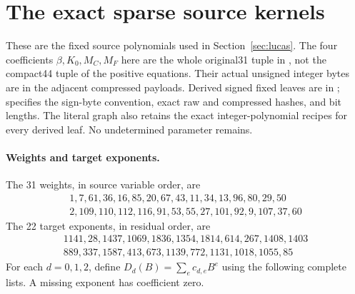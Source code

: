 \section{The exact sparse source kernels}\label{app:kernels}
These are the fixed source polynomials used in Section~\ref{sec:lucas}.
The four coefficients $\beta,K_0,M_C,M_F$ here are the whole original31
tuple in , not the compact44
tuple of the positive equations. Their actual unsigned integer bytes are
in the adjacent compressed payloads. Derived signed fixed leaves are
in ;  specifies
the sign-byte convention, exact raw and compressed hashes, and bit lengths.
The literal graph also retains the exact integer-polynomial recipes for
every derived leaf. No undetermined parameter remains.
\paragraph{Weights and target exponents.}
The 31 weights, in source variable order, are
\[\begin{gathered}
1,7,61,36,16,85,20,67,43,11,34,13,96,80,29,50\\
2,109,110,112,116,91,53,55,27,101,92,9,107,37,60
\end{gathered}\]
The 22 target exponents, in residual order, are
\[\begin{gathered}
1141,28,1437,1069,1836,1354,1814,614,267,1408,1403\\
889,337,1587,413,673,1139,772,1131,1018,1055,85
\end{gathered}\]
For each $d=0,1,2$, define $D_d(B)=\sum_e c_{d,e}B^e$ using the
following complete lists. A missing exponent has coefficient zero.
